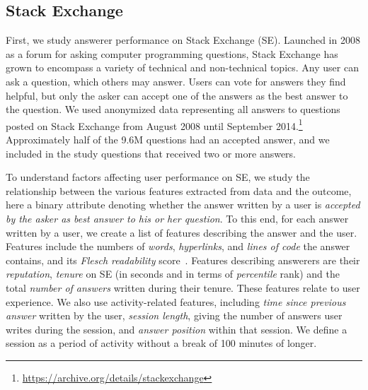 \documentclass[letterpaper]{article} %
\begin{document}
\subsection{Stack Exchange}
First, we study answerer performance on Stack Exchange (SE).  Launched in 2008 as a forum for asking computer programming questions, Stack Exchange has grown to encompass a variety of technical and non-technical topics. Any user can ask a question, which others may answer. Users can vote for answers they find helpful, but only the asker can {accept one of the answers as the best answer to the question}.
We used anonymized data representing all answers to questions posted on Stack Exchange from August 2008 until September 2014.\footnote{\url{https://archive.org/details/stackexchange}} Approximately half of the 9.6M questions had an
accepted answer, and we included in the study questions that received two or more answers.

To understand factors affecting user performance on SE, we study the relationship between the various features extracted from data and the outcome, here a binary attribute denoting whether the answer written by a user is \emph{accepted by the asker as best answer to his or her question}.
To this end, for each answer written by a user, we create a list of features describing the answer and the user. Features include the numbers of \emph{words}, \emph{hyperlinks}, and \emph{lines of code} the answer contains, and its \emph{Flesch readability} score~\cite{Readability}. Features describing answerers are their \emph{reputation}, \emph{tenure} on SE (in seconds and in terms of \emph{percentile} rank) and the total \emph{number of answers} written during their tenure. These features relate to user experience. We also use activity-related features, including \emph{time since previous answer} written by the user, \emph{session length}, giving the number of answers user writes during the session, and \emph{answer position} within that session. We define a session as a period of activity without a break of 100 minutes of longer. %
\end{document}
